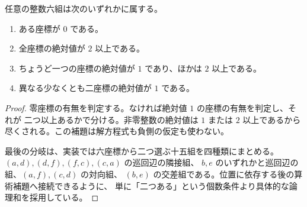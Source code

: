 \begin{lemma}[全整数六組の境界分割]
\label{bp:neg-partition}
\leanok
任意の整数六組は次のいずれかに属する。
\begin{enumerate}
 \item ある座標が \(0\) である。
 \item 全座標の絶対値が \(2\) 以上である。
 \item ちょうど一つの座標の絶対値が \(1\) であり、ほかは \(2\) 以上である。
 \item 異なる少なくとも二座標の絶対値が \(1\) である。
\end{enumerate}
\end{lemma}
\begin{proof}
\leanok
零座標の有無を判定する。なければ絶対値 \(1\) の座標の有無を判定し、それが
二つ以上あるかで分ける。非零整数の絶対値は \(1\) または \(2\) 以上であるから
尽くされる。この補題は解方程式も負側の仮定も使わない。

最後の分岐は、実装では六座標から二つ選ぶ十五組を四種類にまとめる。
\((a,d),(d,f),(f,c),(c,a)\) の巡回辺の隣接組、
\(b,e\) のいずれかと巡回辺の組、\((a,f),(c,d)\) の対向組、
\((b,e)\) の交差組である。位置に依存する後の算術補題へ接続できるように、
単に「二つある」という個数条件より具体的な論理和を採用している。
\end{proof}

